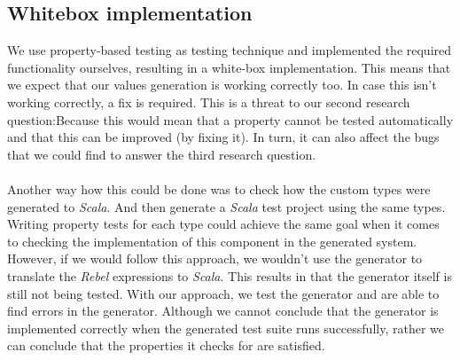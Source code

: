 \subsection*{Whitebox implementation}
We use property-based testing as testing technique and implemented the required
functionality ourselves, resulting in a white-box implementation. This means
that we expect that our values generation is working correctly too. In case this
isn't working correctly, a fix is required. This is a threat to our second research question:\rqTwo Because this would mean that a property cannot be tested automatically and that this can be improved (by fixing it). In turn, it can also affect the bugs that we could find to answer the third research question.\\
\\
Another way how this could be done was to check how the custom types were
generated to \textit{Scala}. And then generate a \textit{Scala} test project
using the same types. Writing property tests for each type could achieve the
same goal when it comes to checking the implementation of this component in the
generated system. However, if we would follow this approach, we wouldn't use the
generator to translate the \textit{Rebel} expressions to \textit{Scala}. This
results in that the generator itself is still not being tested. With our
approach, we test the generator and are able to find errors in the generator.
Although we cannot conclude that the generator is implemented correctly when the
generated test suite runs successfully, rather we can conclude that the
properties it checks for are satisfied.
